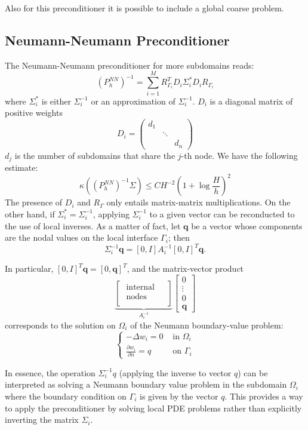 \documentclass[11pt]{book}
\begin{document}
Also for this preconditioner it is possible to include a global coarse problem.

\subsection*{Neumann-Neumann Preconditioner}
The Neumann-Neumann preconditioner for more subdomains reads:
$$
\left(P_h^{N N}\right)^{-1}=\sum_{i=1}^M R_{\Gamma_i}^T D_i \Sigma_i^* D_i R_{\Gamma_i}
$$
where $\Sigma_i^*$ is either $\Sigma_i^{-1}$ or an approximation of $\Sigma_i^{-1}$.
$D_i$ is a diagonal matrix of positive weights
$$
D_i=\left(\begin{array}{ccc}
d_1 & & \\
& \ddots & \\
& & d_n
\end{array}\right)
$$
$d_j$ is the number of subdomains that share the $j$-th node.
We have the following estimate:
$$
\kappa\left(\left(P_h^{N N}\right)^{-1} \Sigma\right) \leq C H^{-2}\left(1+\log \frac{H}{h}\right)^2
$$
The presence of $D_i$ and $R_{\Gamma}$ only entails matrix-matrix multiplications. On the other hand, if $\Sigma_i^*=\Sigma_i^{-1}$, applying $\Sigma_i^{-1}$ to a given vector can be reconducted to the use of local inverses. As a matter of fact, let $\mathbf{q}$ be a vector whose components are the nodal values on the local interface $\Gamma_i$; then
$$
\Sigma_i^{-1} \mathbf{q}=[0, I] A_i^{-1}[0, I]^T \mathbf{q} .
$$

In particular, $[0, I]^T \mathbf{q}=[0, \mathbf{q}]^T$, and the matrix-vector product
$$
\underbrace{\left[\begin{array}{c|c}
\text { internal } \\
\text { nodes } & \\
&
\end{array}\right]}_{A_i^{-1}}\left[\begin{array}{c}
0 \\
\vdots \\
0 \\
\hline \mathbf{q}
\end{array}\right]
$$
corresponds to the solution on $\Omega_i$ of the Neumann boundary-value problem:
$$
\begin{cases}-\Delta w_i=0 & \text { in } \Omega_i \\ \frac{\partial w_i}{\partial n}=q & \text { on } \Gamma_i\end{cases}
$$

In essence, the operation \( \Sigma_i^{-1} q \) (applying the inverse to vector \( q \)) can be interpreted as solving a Neumann boundary value problem in the subdomain \( \Omega_i \) where the boundary condition on \( \Gamma_i \) is given by the vector \( q \). This provides a way to apply the preconditioner by solving local PDE problems rather than explicitly inverting the matrix \( \Sigma_i \).
\end{document}
